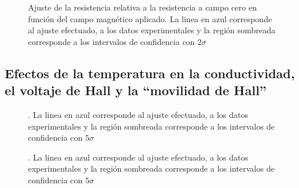 \documentclass[%
 reprint,
 amsmath,amssymb,
 aps,
]{revtex4-1}
\begin{document}
\begin{figure}[h]
\caption{\label{R_vs_Campo}Ajuste de la resistencia relativa a la resistencia a campo cero en función del campo magnético aplicado.  La linea en azul corresponde al ajuste efectuado, a los datos experimentales y la región sombreada corresponde a los intervalos de confidencia con $2\sigma$}
\end{figure}

\subsection{Efectos de la temperatura en la conductividad, el voltaje de Hall y la ``movilidad de Hall''}

\begin{figure}[h]
\caption{\label{Conductividad en función de la temperatura}.  La linea en azul corresponde al ajuste efectuado, a los datos experimentales y la región sombreada corresponde a los intervalos de confidencia con $5\sigma$}
\end{figure}


\begin{figure}[h]
\caption{\label{Region intrinseca}.  La linea en azul corresponde al ajuste efectuado, a los datos experimentales y la región sombreada corresponde a los intervalos de confidencia con $5\sigma$}
\end{figure}
\end{document}
